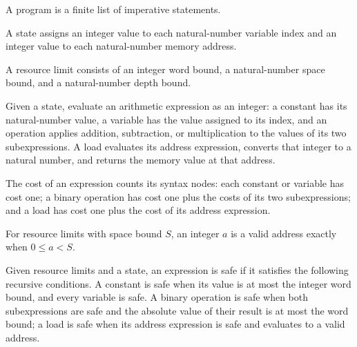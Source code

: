 \begin{definition}
\label{Light.Program}
\leanok
{}
A program is a finite list of imperative statements.
\end{definition}

\begin{definition}
\label{Light.State}
\leanok
A state assigns an integer value to each natural-number variable index and an integer
value to each natural-number memory address.
\end{definition}

\begin{definition}
\label{Light.Limits}
\leanok
A resource limit consists of an integer word bound, a natural-number space bound, and a
natural-number depth bound.
\end{definition}

\begin{definition}
\label{Light.Expr.val}
\leanok
{}
Given a state, evaluate an arithmetic expression as an integer: a constant has its
natural-number value, a variable has the value assigned to its index, and an operation
applies addition, subtraction, or multiplication to the values of its two
subexpressions. A load evaluates its address expression, converts that integer to a
natural number, and returns the memory value at that address.
\end{definition}

\begin{definition}
\label{Light.Expr.cost}
\leanok
{}
The cost of an expression counts its syntax nodes: each constant or variable has cost
one; a binary operation has cost one plus the costs of its two subexpressions; and a
load has cost one plus the cost of its address expression.
\end{definition}

\begin{definition}
\label{Light.Limits.Addr}
\leanok
{}
For resource limits with space bound $S$, an integer $a$ is a valid address exactly when
$0 \le a < S$.
\end{definition}

\begin{definition}
\label{Light.Expr.Safe}
\leanok
{}
Given resource limits and a state, an expression is safe if it satisfies the following
recursive conditions. A constant is safe when its value is at most the integer word
bound, and every variable is safe. A binary operation is safe when both subexpressions
are safe and the absolute value of their result is at most the word bound; a load is
safe when its address expression is safe and evaluates to a valid address.
\end{definition}

